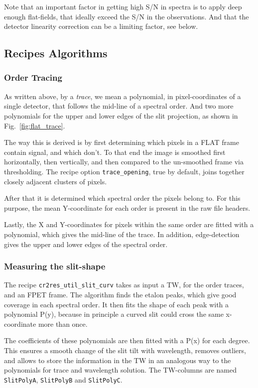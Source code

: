 Note that an important factor in getting high S/N in spectra is to apply deep
enough flat-fields, that ideally exceed the S/N in the observations. And that
the detector linearity correction can be a limiting factor, see below.

\subsection{Recipes Algorithms} 
\label{sec:algorithms-recipes}

\subsubsection{Order Tracing}
\label{sec:ordertrace}

As written above, by a \emph{trace}, we mean a polynomial, in pixel-coordinates
of a single detector, that follows the mid-line of a spectral order. And two
more polynomials for the upper and lower edges of the slit projection, as shown
in Fig.~\ref{fig:flat_trace}.

The way this is derived is by first determining which pixels in a FLAT frame
contain signal, and which don't. To that end the image is smoothed first
horizontally, then vertically, and then compared to the un-smoothed frame via
thresholding. The recipe option \verb!trace_opening!, true by default, joins
together closely adjacent clusters of pixels.

After that it is determined which spectral order the pixels belong to. For this
purpose, the mean Y-coordinate for each order is present in the raw file
headers.

Lastly, the X and Y-coordinates for pixels within the same order are fitted with
a polynomial, which gives the mid-line of the trace. In addition, edge-detection
gives the upper and lower edges of the spectral order.

\subsubsection{Measuring the slit-shape}
\label{sec:tilt}

The recipe \verb!cr2res_util_slit_curv! takes as input a TW, for the order
traces, and an FPET frame. The algorithm finds the etalon peaks, which give good
coverage in each spectral order. It then fits the shape of each peak with a
polynomial P(y), because in principle a curved slit could cross the same
x-coordinate more than once.

The coefficients of these polynomials are then fitted with a P(x) for each
degree. This ensures a smooth change of the slit tilt with wavelength, removes
outliers, and allows to store the information in the TW in an analogous way to
the polynomials for trace and wavelength solution. The TW-columns are named
\verb!SlitPolyA!, \verb!SlitPolyB! and \verb!SlitPolyC!.

